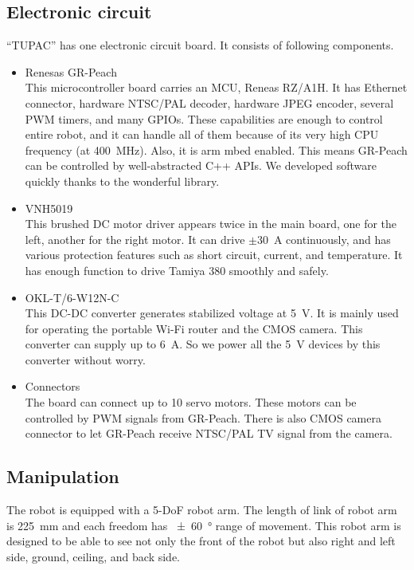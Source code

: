 \documentclass[journal]{IEEEtran}
\begin{document}
\subsection{Electronic circuit}
``TUPAC'' has one electronic circuit board.
It consists of following components.
\begin{itemize}
    \item Renesas GR-Peach \\
    This microcontroller board carries an MCU, Reneas RZ/A1H.
    It has Ethernet connector, hardware NTSC/PAL decoder, hardware JPEG encoder, several PWM timers, and many GPIOs.
    These capabilities are enough to control entire robot, and it can handle all of them because of its very high CPU frequency (at \SI{400}{\MHz}).
    Also, it is arm mbed enabled. %
    This means GR-Peach can be controlled by well-abstracted C++ APIs.
    We developed software quickly thanks to the wonderful library.
    \item VNH5019 \\
    This brushed DC motor driver appears twice in the main board, one for the left, another for the right motor.
    It can drive \(\pm\)\SI{30}{\A} continuously, and has various protection features such as short circuit, current, and temperature.
    It has enough function to drive Tamiya 380 smoothly and safely.
    \item OKL-T/6-W12N-C \\
    This DC-DC converter generates stabilized voltage at \SI{5}{\V}.
    It is mainly used for operating the portable Wi-Fi router and the CMOS camera.
    This converter can supply up to \SI{6}{\A}. %
    So we power all the \SI{5}{\V} devices by this converter without worry.
    \item Connectors \\
    The board can connect  up to 10 servo motors.
    These motors can be controlled by PWM signals from GR-Peach.
    There is also CMOS camera connector to let GR-Peach receive NTSC/PAL TV signal from the camera.
\end{itemize}

\subsection{Manipulation}
The robot is equipped with a 5-DoF robot arm.
The length of link of robot arm is \SI{225}{\mm} and each freedom has \SI{\pm60}{\degree} range of movement.
This robot arm is designed to be able to see not only the front of the robot but also right and left side, ground, ceiling, and back side.
\end{document}
